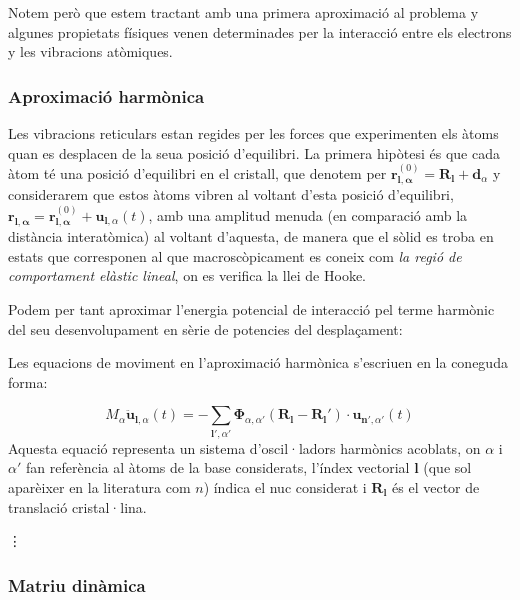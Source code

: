 \documentclass[12pt]{article} %
\let\vec\mathbf %
\begin{document}
Notem però que estem tractant amb una primera aproximació al problema y algunes propietats físiques venen determinades per la interacció entre els electrons y les vibracions atòmiques.



  
\subsubsection{Aproximació harmònica}

Les vibracions reticulars estan regides per les forces que experimenten els àtoms quan es desplacen de la seua posició d'equilibri. La primera hipòtesi és que cada àtom té una posició d'equilibri en el cristall, que denotem per $\vec r^{(0)}_{\vec l,\vec\alpha}=\vec R_\vec l+\vec d_\alpha$ y considerarem que estos àtoms vibren al voltant d'esta posició d'equilibri, $\vec r_{\vec l,\vec\alpha}=\vec r^{(0)}_{\vec l,\vec\alpha}+\vec u_{\vec l,\alpha}(t)$, amb una amplitud menuda (en comparació amb la distància interatòmica) al voltant d'aquesta,   de manera que el sòlid es troba en estats que corresponen al que macroscòpicament es coneix com \textit{la regió de comportament elàstic lineal}, on es verifica la llei de Hooke.

Podem per tant aproximar l'energia potencial de interacció pel terme harmònic del seu desenvolupament en sèrie de potencies del despla\c{c}ament:

Les equacions de moviment en l'aproximació harmònica s'escriuen en la coneguda forma:

\begin{equation}
 M_\alpha\vec{\ddot{u}}_{\vec l,\alpha}(t)=-\sum_{\vec l',\alpha'}\vec\Phi_{\alpha,\alpha'}\left(\vec R_\vec l-\vec R_\vec l'\right)\cdot\vec u_{\vec n',\alpha'}(t)
\end{equation}
 Aquesta equació representa un sistema  d'oscil·ladors harmònics acoblats, on $\alpha$ i $\alpha'$ fan referència al àtoms de la base considerats, l'índex vectorial $\vec l$ (que sol aparèixer en la literatura com $n$) índica el nuc considerat i $\vec R_\vec l$ és el vector de translació cristal·lina.
 
\vdots 




\subsubsection{Matriu dinàmica}
\end{document}

